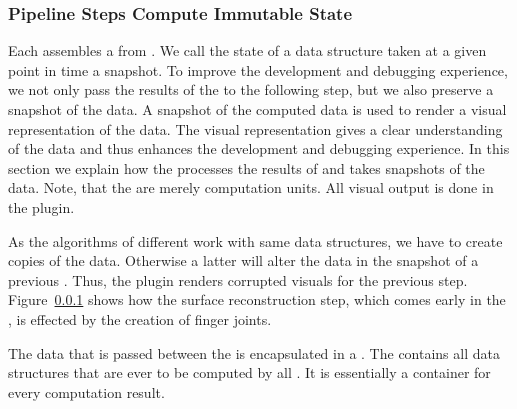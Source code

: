 \documentclass[../ClassicThesis.tex]{subfiles}
\begin{document}
\paragraph{}


\subsubsection{Pipeline Steps Compute Immutable State}

Each {\fabmethod} assembles a  from
. We call the state of a data structure
taken at a given point in time a snapshot. To improve the
development and debugging experience, we not only pass the
results of the  to the following step,
but we also preserve a snapshot of the data. A snapshot of
the computed data is used to render a visual representation
of the data. The visual representation gives a clear
understanding of the data and thus enhances the development
and debugging experience. In this section we explain how the
 processes the results of
 and takes snapshots of the data. Note,
that the  are merely computation units.
All visual output is done in the 
plugin.



As the algorithms of different  work
with same data structures, we have to create copies of the
data. Otherwise a latter  will alter the
data in the snapshot of a previous .
Thus, the  plugin renders corrupted
visuals for the previous step. Figure~\ref{}  shows how the
surface reconstruction step, which comes early in the
, is effected by the creation of finger
joints.


The data that is passed between the  is
encapsulated in a . The
 contains all data structures that are
ever to be computed by all . It is
essentially a container for every computation result.
\end{document}

